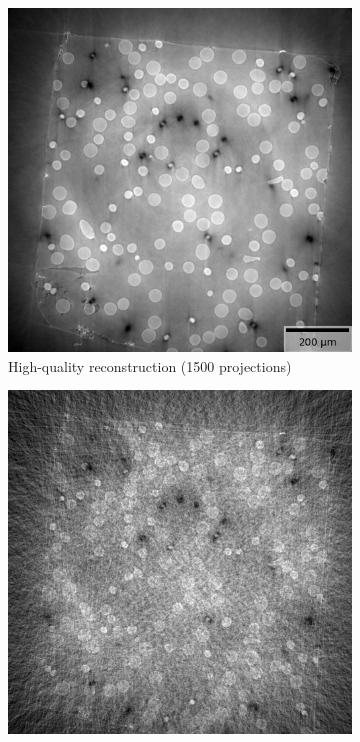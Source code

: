 \begin{figure}
    \begin{subfigure}[t]{.45\textwidth}
      \centering
      \includegraphics[width=\linewidth]{figures/gt32.png}
      \caption{High-quality reconstruction (1500 projections)}
    \end{subfigure}
    \hfill
    \begin{subfigure}[t]{.45\textwidth}
      \centering
      \includegraphics[width=\linewidth]{figures/ns32.png}

\end{subfigure}
\end{figure}
